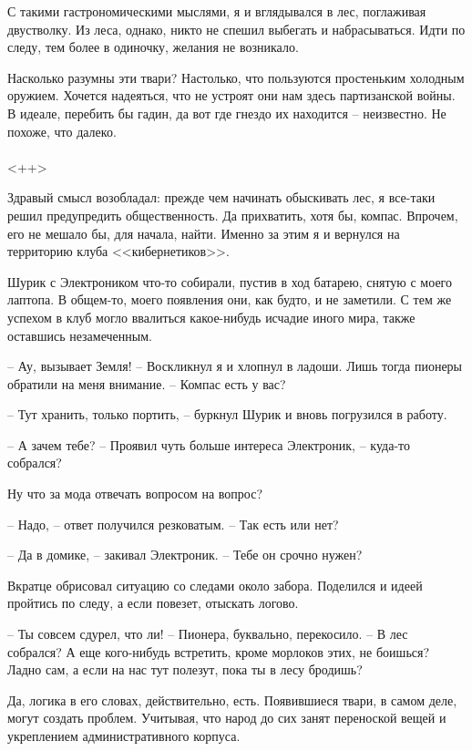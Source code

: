 \documentclass[a4paper]{book}
\begin{document}
С такими гастрономическими мыслями, я и вглядывался в лес, поглаживая двустволку. Из леса, однако, никто не спешил выбегать и набрасываться. Идти по следу, тем более в одиночку, желания не возникало. 

Насколько разумны эти твари? Настолько, что пользуются простеньким холодным оружием. Хочется надеяться, что не устроят они нам здесь партизанской войны. В идеале, перебить бы гадин, да вот где гнездо их находится -- неизвестно. Не похоже, что далеко.

\paragraph{}<++>

Здравый смысл возобладал: прежде чем начинать обыскивать лес, я все-таки решил предупредить общественность. Да прихватить, хотя бы, компас. Впрочем, его не мешало бы, для начала, найти. Именно за этим я и вернулся на территорию клуба <<кибернетиков>>. 

Шурик с Электроником что-то собирали, пустив в ход батарею, снятую с моего лаптопа.  В общем-то, моего появления они, как будто, и не заметили. С тем же успехом в клуб могло ввалиться какое-нибудь исчадие иного мира, также оставшись незамеченным.

-- Ау, вызывает Земля! -- Воскликнул я и хлопнул в ладоши. Лишь тогда пионеры обратили на меня внимание. -- Компас есть у вас? 

-- Тут хранить, только портить, -- буркнул Шурик и вновь погрузился в работу.

-- А зачем тебе? -- Проявил чуть больше интереса Электроник, -- куда-то собрался?

Ну что за мода отвечать вопросом на вопрос?

-- Надо, -- ответ получился резковатым. -- Так есть или нет?

-- Да в домике, -- закивал Электроник. -- Тебе он срочно нужен?

Вкратце обрисовал ситуацию со следами около забора. Поделился и идеей пройтись по следу, а если повезет, отыскать логово. 

-- Ты совсем сдурел, что ли! -- Пионера, буквально, перекосило. -- В лес собрался? А еще кого-нибудь встретить, кроме морлоков этих, не боишься? Ладно сам, а если на нас тут полезут, пока ты в лесу бродишь?

Да, логика в его словах, действительно, есть. Появившиеся твари, в самом деле, могут создать проблем. Учитывая, что народ до сих занят переноской вещей и укреплением административного корпуса. 
\end{document}
